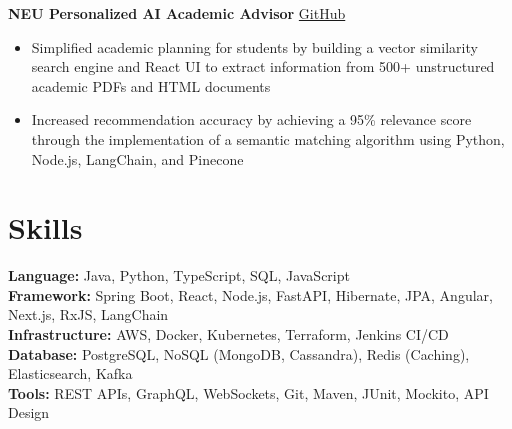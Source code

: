 \documentclass[11pt]{article}       %
\begin{document}
\textbf{NEU Personalized AI Academic Advisor} \hfill \href{https://github.com/darshan-aswathappa/web-dev-6150-final}{GitHub} \\
\vspace{-9pt}
\begin{itemize}
  \item Simplified academic planning for students by building a vector similarity search engine and React UI to extract information from 500+ unstructured academic PDFs and HTML documents
  \item Increased recommendation accuracy by achieving a 95\% relevance score through the implementation of a semantic matching algorithm using Python, Node.js, LangChain, and Pinecone
\end{itemize}


\vspace{-18.5pt}

\section*{Skills}
\textbf{Language:} Java, Python, TypeScript, SQL, JavaScript \\
\textbf{Framework:} Spring Boot, React, Node.js, FastAPI, Hibernate, JPA, Angular, Next.js, RxJS, LangChain \\
\textbf{Infrastructure:} AWS, Docker, Kubernetes, Terraform, Jenkins CI/CD \\
\textbf{Database:} PostgreSQL, NoSQL (MongoDB, Cassandra), Redis (Caching), Elasticsearch, Kafka \\
\textbf{Tools:} REST APIs, GraphQL, WebSockets, Git, Maven, JUnit, Mockito, API Design
\end{document}
